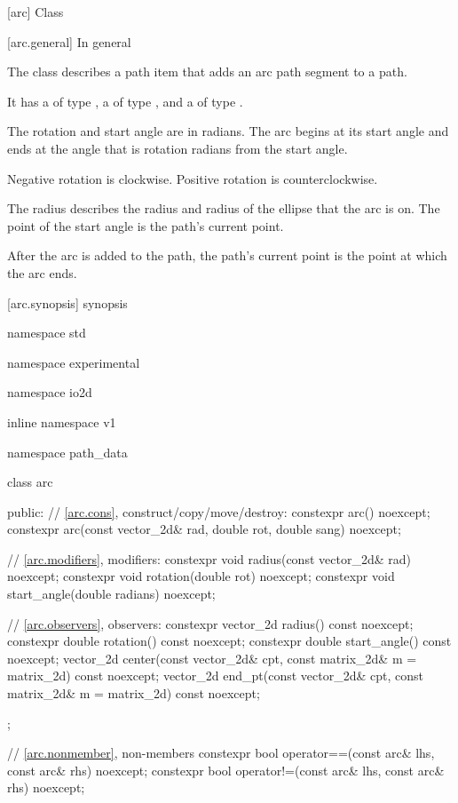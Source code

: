  [arc] {Class }%

 [arc.general] {In general}%

\pnum
{}%
The class  describes a path item that adds an arc path segment to a path.

\pnum
It has a  of type , a  of type , and a  of type .

\pnum
The rotation and start angle are in radians. The arc begins at its start angle and ends at the angle that is rotation radians from the start angle.

\pnum
\begin{note}
Negative rotation is clockwise. Positive rotation is counterclockwise.
\end{note}

\pnum
The radius describes the \xaxis radius and \yaxis radius of the ellipse that the arc is on. The point of the start angle is the path's current point.

\pnum
After the arc is added to the path, the path's current point is the point at which the arc ends.

 [arc.synopsis] { synopsis}%

\begin{codeblock}
namespace std { namespace experimental { namespace io2d { inline namespace v1 {
  namespace path_data {
    class arc {
    public:
      // \ref{arc.cons}, construct/copy/move/destroy:
      constexpr arc() noexcept;
      constexpr arc(const vector_2d& rad,
        double rot, double sang) noexcept;

      // \ref{arc.modifiers}, modifiers:
      constexpr void radius(const vector_2d& rad) noexcept;
      constexpr void rotation(double rot) noexcept;
      constexpr void start_angle(double radians) noexcept;

      // \ref{arc.observers}, observers:
      constexpr vector_2d radius() const noexcept;
      constexpr double rotation() const noexcept;
      constexpr double start_angle() const noexcept;
      vector_2d center(const vector_2d& cpt, const matrix_2d& m = matrix_2d{}) 
        const noexcept;
      vector_2d end_pt(const vector_2d& cpt, const matrix_2d& m = matrix_2d{}) 
        const noexcept;
    };
    
    // \ref{arc.nonmember}, non-members
    constexpr bool operator==(const arc& lhs, const arc& rhs) noexcept;
    constexpr bool operator!=(const arc& lhs, const arc& rhs) noexcept;
  }
} } } }
\end{codeblock}

